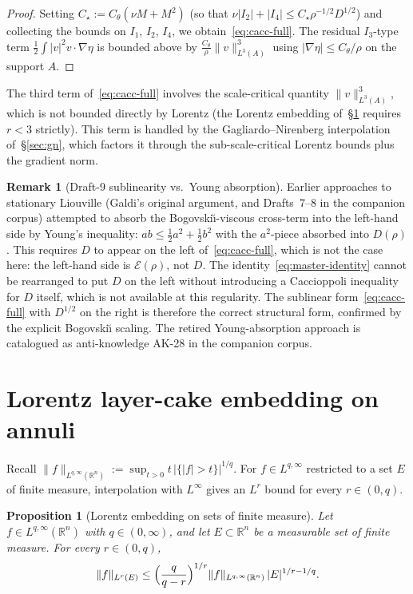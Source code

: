 \documentclass[11pt]{amsart}
\newtheorem{proposition}[theorem]{Proposition}
\theoremstyle{definition}
\newtheorem{remark}[theorem]{Remark}
\newcommand{\RR}{\mathbb{R}}
\newcommand{\EE}{\mathcal{E}}    %
\newcommand{\DD}{D}              %
\newcommand{\norm}[1]{\|#1\|}
\newcommand{\abs}[1]{|#1|}
\begin{document}
\begin{proof}
Setting $C_\star := C_\theta(\nu M + M^2)$ (so that
$\nu\abs{I_2} + \abs{I_4} \leq C_\star \rho^{-1/2} \DD^{1/2}$)
and collecting the bounds on $I_1$, $I_2$, $I_4$, we
obtain~\eqref{eq:cacc-full}. The residual $I_3$-type term
$\frac{1}{2}\int \abs{v}^2 v \cdot \nabla\eta$ is bounded above
by $\frac{C_\theta}{\rho}\norm{v}_{L^3(A)}^3$ using
$\abs{\nabla\eta} \leq C_\theta/\rho$ on the support $A$.
\end{proof}

The third term of~\eqref{eq:cacc-full} involves the scale-critical
quantity $\norm{v}_{L^3(A)}^3$, which is not bounded directly by
Lorentz (the Lorentz embedding of~\S\ref{sec:lorentz} requires
$r < 3$ strictly). This term is handled by the Gagliardo--Nirenberg
interpolation of~\S\ref{sec:gn}, which factors it through the
sub-scale-critical Lorentz bounds plus the gradient norm.

\begin{remark}[Draft-9 sublinearity vs.\ Young absorption]
\label{rem:no-young}
Earlier approaches to stationary Liouville (Galdi's original
argument, and Drafts~7--8 in the companion corpus) attempted to
absorb the Bogovski\u{\i}-viscous cross-term into the left-hand
side by Young's inequality: $ab \leq \tfrac{1}{2}a^2 +
\tfrac{1}{2}b^2$ with the $a^2$-piece absorbed into $\DD(\rho)$.
This requires $\DD$ to appear on the left of~\eqref{eq:cacc-full},
which is not the case here: the left-hand side is $\EE(\rho)$,
not $\DD$. The identity~\eqref{eq:master-identity} cannot be
rearranged to put $\DD$ on the left without introducing a
Caccioppoli inequality for $\DD$ itself, which is not available
at this regularity. The sublinear form~\eqref{eq:cacc-full} with
$\DD^{1/2}$ on the right is therefore the correct structural
form, confirmed by the explicit Bogovski\u{\i} scaling. The
retired Young-absorption approach is catalogued as anti-knowledge
AK-28 in the companion corpus.
\end{remark}

\section{Lorentz layer-cake embedding on annuli}\label{sec:lorentz}

Recall $\norm{f}_{L^{q,\infty}(\RR^n)} := \sup_{t > 0} t\,
\abs{\{\abs{f} > t\}}^{1/q}$. For $f \in L^{q,\infty}$ restricted
to a set $E$ of finite measure, interpolation with $L^\infty$
gives an $L^r$ bound for every $r \in (0, q)$.

\begin{proposition}[Lorentz embedding on sets of finite measure]
\label{prop:lorentz-emb}
Let $f \in L^{q,\infty}(\RR^n)$ with $q \in (0, \infty)$, and let
$E \subset \RR^n$ be a measurable set of finite measure. For
every $r \in (0, q)$,
\begin{equation}\label{eq:lorentz}
\norm{f}_{L^r(E)} \leq \Bigl(\frac{q}{q - r}\Bigr)^{1/r}
\norm{f}_{L^{q,\infty}(\RR^n)}\, \abs{E}^{1/r - 1/q}.
\end{equation}
\end{proposition}
\end{document}
